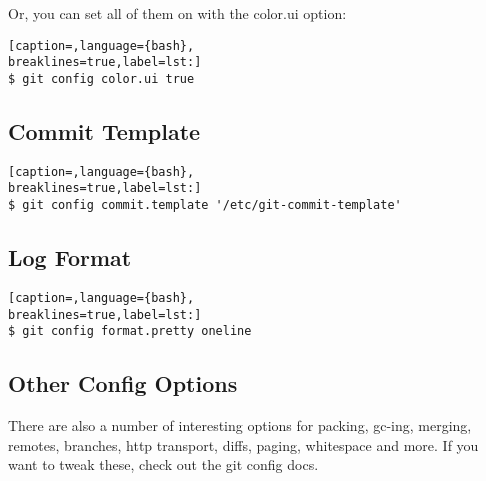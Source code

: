 Or, you can set all of them on with the color.ui option:
\lstset{basicstyle=\scriptsize, numbers=none, captionpos=b, tabsize=4}
\begin{lstlisting}[caption=,language={bash},
breaklines=true,label=lst:]
$ git config color.ui true
\end{lstlisting}

\subsection{Commit Template}
\lstset{basicstyle=\scriptsize, numbers=none, captionpos=b, tabsize=4}
\begin{lstlisting}[caption=,language={bash},
breaklines=true,label=lst:]
$ git config commit.template '/etc/git-commit-template'
\end{lstlisting}

\subsection{Log Format}
\lstset{basicstyle=\scriptsize, numbers=none, captionpos=b, tabsize=4}
\begin{lstlisting}[caption=,language={bash},
breaklines=true,label=lst:]
$ git config format.pretty oneline
\end{lstlisting}

\subsection{Other Config Options}
There are also a number of interesting options for packing, gc-ing, merging,
remotes, branches, http transport, diffs, paging, whitespace and more. If you
want to tweak these, check out the git config docs.
